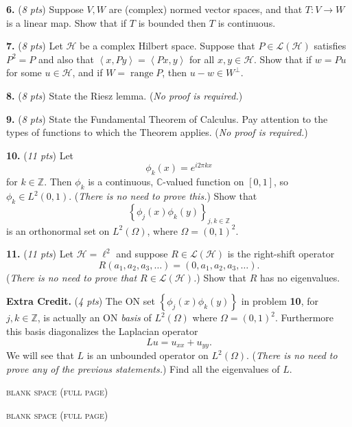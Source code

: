 \documentclass[12pt]{amsart}
\newcommand{\cH}{\mathcal{H}}
\newcommand{\cL}{\mathcal{L}}
\newcommand{\CC}{{\mathbb{C}}}
\newcommand{\ZZ}{{\mathbb{Z}}}
\newcommand{\ip}[2]{\left<#1,#2\right>}
\newcommand{\range}{\operatorname{range}}
\newcommand{\prob}[1]{\bigskip\noindent\textbf{#1.} }
\newcommand{\pts}[1]{(\emph{#1 pts})}
\newcommand{\probpts}[2]{\prob{#1} \pts{#2} \quad}
\begin{document}
\clearpage\newpage
\probpts{6}{8}  Suppose $V,W$ are (complex) normed vector spaces, and that $T:V\to W$ is a linear map.  Show that if $T$ is bounded then $T$ is continuous.
\vfill

\probpts{7}{8}  Let $\cH$ be a complex Hilbert space.  Suppose that $P\in\cL(\cH)$ satisfies $P^2=P$ and also that $\ip{x}{Py}=\ip{Px}{y}$ for all $x,y\in\cH$.  Show that if $w=Pu$ for some $u\in\cH$, and if $W=\range P$, then $u-w \in W^\perp$.
\vfill


\clearpage\newpage
\probpts{8}{8}  State the Riesz lemma.  (\emph{No proof is required.})
\vfill

\probpts{9}{8}  State the Fundamental Theorem of Calculus.  Pay attention to the types of functions to which the Theorem applies.  (\emph{No proof is required.})
\vfill


\clearpage\newpage
\probpts{10}{11}  Let
	$$\phi_k(x) = e^{i 2\pi k x}$$
for $k\in\ZZ$.  Then $\phi_k$ is a continuous, $\CC$-valued function on $[0,1]$, so $\phi_k \in L^2(0,1)$.  (\emph{There is no need to prove this.})  Show that
	$$\left\{\phi_j(x) \phi_k(y)\right\}_{j,k\in\ZZ}$$
is an orthonormal set on $L^2(\Omega)$, where $\Omega=(0,1)^2$.
\vfill


\clearpage\newpage
\probpts{11}{11}  Let $\cH=\ell^2$ and suppose $R\in\cL(\cH)$ is the right-shift operator
	$$R (a_1,a_2,a_3,\dots) = (0,a_1,a_2,a_3,\dots).$$
(\emph{There is no need to prove that $R\in\cL(\cH)$.})  Show that $R$ has no eigenvalues.
\vfill


\clearpage\newpage
\probpts{Extra Credit}{4}  The ON set $\left\{\phi_j(x) \phi_k(y)\right\}$ in problem \textbf{10}, for $j,k\in\ZZ$, is actually an ON \emph{basis} of $L^2(\Omega)$ where $\Omega=(0,1)^2$.  Furthermore this basis diagonalizes the Laplacian operator
	$$L u = u_{xx} + u_{yy}.$$
We will see that $L$ is an unbounded operator on $L^2(\Omega)$.  (\emph{There is no need to prove any of the previous statements.})  Find all the eigenvalues of $L$.
\vfill

\clearpage
\newpage
\thispagestyle{empty}
\begin{center}
\small
\textsc{blank space (full page)}
\end{center}
\vfill

\clearpage
\newpage
\thispagestyle{empty}
\begin{center}
\small
\textsc{blank space (full page)}
\end{center}
\vfill
\end{document}
